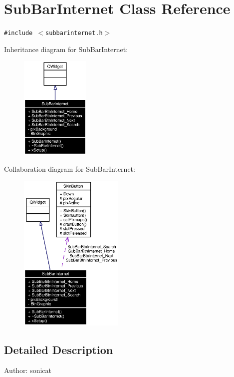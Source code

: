 \section{Sub\-Bar\-Internet Class Reference}
\label{classSubBarInternet}
{\tt \#include $<$subbarinternet.h$>$}

Inheritance diagram for Sub\-Bar\-Internet:\begin{figure}[H]
\begin{center}
\leavevmode
\includegraphics[width=94pt]{classSubBarInternet__inherit__graph}
\end{center}
\end{figure}
Collaboration diagram for Sub\-Bar\-Internet:\begin{figure}[H]
\begin{center}
\leavevmode
\includegraphics[width=142pt]{classSubBarInternet__coll__graph}
\end{center}
\end{figure}


\subsection{Detailed Description}
\begin{Desc}
\item[Author:]sonicat \end{Desc}




